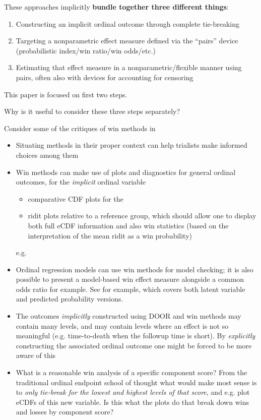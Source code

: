 \documentclass[
  11pt,
  fleqn
]{article}
\begin{document}
These approaches implicitly \textbf{bundle together three different things}:
\begin{enumerate}
  \item Constructing an implicit ordinal outcome through
    complete tie-breaking
  \item Targeting a nonparametric effect measure defined via the
    ``pairs'' device (probabilistic
    index/win ratio/win odds/etc.)
  \item Estimating that effect measure in a nonparametric/flexible
    manner using pairs, often also with devices for accounting for censoring
\end{enumerate}

This paper is focused on first two steps.

Why is it useful to consider these three steps separately?

Consider some of the critiques of win methods in
\citet[e.g.~][]{ajufoFallaciesUsingWin2023}

\begin{itemize}
  \item Situating methods in their proper context can help
    trialists make informed choices among them
  \item Win methods can make use of
    plots and diagnostics for general ordinal outcomes, for the
    \emph{implicit} ordinal variable
    \begin{itemize}
      \item
        comparative CDF plots for the
      \item ridit plots
        \citep{brossHowUseRidit1958,jansenRiditAnalysisReview1984}
        relative to a reference group, which should allow one to
        display both full eCDF information and also win statistics
        (based on the interpretation of the mean ridit as a win probability)
    \end{itemize}e.g.
  \item Ordinal regression models can use win methods for model checking; it is
    also possible to present a model-based win effect measure alongside a common
    odds ratio for example. See
    \citep{agrestiOrdinalProbabilityEffect2017} for example, which
    covers both latent variable and predicted probability versions.
  \item The outcomes \emph{implicitly} constructed using
    DOOR and win methods may contain many levels, and may contain
    levels where an
    effect is not so meaningful (e.g. time-to-death when the followup time is
    short). By \emph{explicitly} constructing the associated ordinal outcome one
    might be forced to be more aware of this
  \item What is a reasonable win
    analysis of a specific component score? From the traditional
    ordinal endpoint
    school of thought what would make most sense is to \emph{only
      tie-break for the
    lowest and highest levels of that score}, and e.g. plot eCDFs of this new
    variable. Is this what the plots do that break down wins and losses by
    component score?
\end{itemize}
\end{document}
